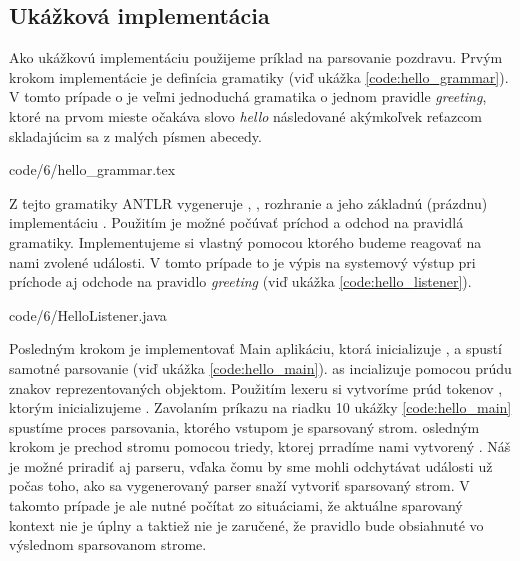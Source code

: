 \subsection{Ukážková implementácia}
Ako ukážkovú implementáciu použijeme príklad na parsovanie pozdravu. Prvým krokom implementácie je definícia gramatiky (viď ukážka \ref{code:hello_grammar}). V tomto prípade o je veľmi jednoduchá gramatika o jednom pravidle \textit{greeting}, ktoré na prvom mieste očakáva slovo \textit{hello} následované akýmkoľvek reťazcom skladajúcim sa z malých písmen abecedy.


            {code/6/hello_grammar.tex}

Z tejto gramatiky ANTLR vygeneruje , , rozhranie  a jeho základnú (prázdnu) implementáciu . Použitím je možné počúvať príchod a odchod na pravidlá gramatiky. Implementujeme si vlastný  pomocou ktorého budeme reagovať na nami zvolené události. V tomto prípade to je výpis na systemový výstup pri príchode aj odchode na pravidlo \textit{greeting} (viď ukážka \ref{code:hello_listener}).


            {code/6/HelloListener.java}

Posledným krokom je implementovať Main aplikáciu, ktorá inicializuje ,  a spustí samotné parsovanie (viď ukážka \ref{code:hello_main}).  as incializuje pomocou prúdu znakov reprezentovaných  objektom. Použitím lexeru si vytvoríme prúd tokenov , ktorým inicializujeme . Zavolaním príkazu na riadku 10 ukážky \ref{code:hello_main} spustíme proces parsovania, ktorého vstupom je sparsovaný strom. osledným krokom je prechod stromu pomocou  triedy, ktorej prradíme nami vytvorený . Náš  je možné priradiť aj parseru, vďaka čomu by sme mohli odchytávat události už počas toho, ako sa vygenerovaný parser snaží vytvoriť sparsovaný strom. V takomto prípade je ale nutné počítat zo situáciami, že aktuálne sparovaný kontext nie je úplny a taktiež nie je zaručené, že pravidlo bude obsiahnuté vo výslednom sparsovanom strome. 

